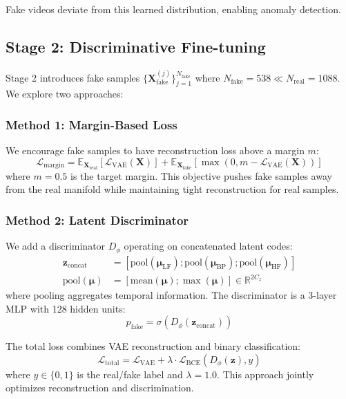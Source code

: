 \documentclass[11pt,twocolumn]{article}
\begin{document}
Fake videos deviate from this learned distribution, enabling anomaly detection.

\subsection{Stage 2: Discriminative Fine-tuning}

Stage 2 introduces fake samples $\{\mathbf{X}^{(j)}_{\text{fake}}\}_{j=1}^{N_{\text{fake}}}$ where $N_{\text{fake}} = 538 \ll N_{\text{real}} = 1088$. We explore two approaches:

\subsubsection{Method 1: Margin-Based Loss}

We encourage fake samples to have reconstruction loss above a margin $m$:
\begin{equation}
\mathcal{L}_{\text{margin}} = \mathbb{E}_{\mathbf{X}_{\text{real}}}[\mathcal{L}_{\text{VAE}}(\mathbf{X})] + \mathbb{E}_{\mathbf{X}_{\text{fake}}}[\max(0, m - \mathcal{L}_{\text{VAE}}(\mathbf{X}))]
\end{equation}
where $m=0.5$ is the target margin. This objective pushes fake samples away from the real manifold while maintaining tight reconstruction for real samples.

\subsubsection{Method 2: Latent Discriminator}

We add a discriminator $D_\phi$ operating on concatenated latent codes:
\begin{align}
    \mathbf{z}_{\text{concat}} &= [\text{pool}(\boldsymbol{\mu}_{\text{LF}}); \text{pool}(\boldsymbol{\mu}_{\text{BP}}); \text{pool}(\boldsymbol{\mu}_{\text{HF}})] \\
    \text{pool}(\boldsymbol{\mu}) &= [\text{mean}(\boldsymbol{\mu}); \max(\boldsymbol{\mu})] \in \mathbb{R}^{2C_z}
\end{align}
where pooling aggregates temporal information. The discriminator is a 3-layer MLP with 128 hidden units:
\begin{equation}
    p_{\text{fake}} = \sigma(D_\phi(\mathbf{z}_{\text{concat}}))
\end{equation}

The total loss combines VAE reconstruction and binary classification:
\begin{equation}
\mathcal{L}_{\text{total}} = \mathcal{L}_{\text{VAE}} + \lambda \cdot \mathcal{L}_{\text{BCE}}(D_\phi(\mathbf{z}), y)
\end{equation}
where $y \in \{0, 1\}$ is the real/fake label and $\lambda=1.0$. This approach jointly optimizes reconstruction and discrimination.
\end{document}
